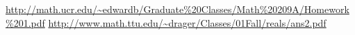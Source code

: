 \begin{enumerate}
\begin{pf}
\url{http://math.ucr.edu/~edwardb/Graduate%20Classes/Math%20209A/Homework%201.pdf}
\url {http://www.math.ttu.edu/~drager/Classes/01Fall/reals/ans2.pdf}
\end{pf}

\end{enumerate}